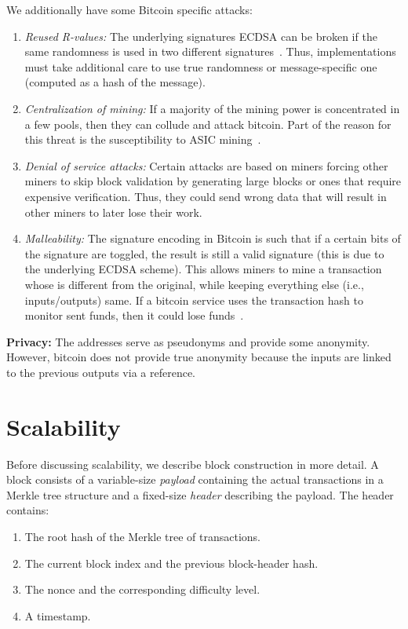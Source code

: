 \documentclass[]{report}   %
\begin{document}
We additionally have some Bitcoin specific attacks:
\begin{enumerate}
	\item {\em Reused R-values:} The underlying signatures ECDSA can be broken if the same randomness is used in two different signatures~\cite{reusedRvalues}. Thus, implementations must take additional care to use true randomness or message-specific one (computed as a hash of the message).
	\item {\em Centralization of mining:} If a majority of the mining power is concentrated in a few pools, then they can collude and attack bitcoin. Part of the reason for this threat is the susceptibility to ASIC mining~\cite{asic}.
	\item {\em Denial of service attacks:} Certain attacks are based on miners forcing other miners to skip block validation by generating large blocks or ones that require expensive verification. Thus, they could send wrong data that will result in other miners to later lose their work.
	\item {\em Malleability:} The signature encoding in Bitcoin is such that if a certain bits of the signature are toggled, the result is still a valid signature (this is due to the underlying ECDSA scheme). This allows miners to mine a transaction whose is different from the original, while keeping everything else (i.e., inputs/outputs) same. If a bitcoin service uses the transaction hash to monitor sent funds, then it could lose funds~\cite{gox}.
\end{enumerate}

\textbf{Privacy:} The addresses serve as pseudonyms and provide some anonymity. However, bitcoin does not provide true anonymity because the inputs are linked to the previous outputs via a reference.


\section{Scalability}

Before discussing scalability, we describe block construction in more detail. A block consists of a variable-size {\em payload} containing the actual transactions in a Merkle tree structure and a fixed-size {\em header} describing the payload. The header contains: 
\begin{enumerate}
	\item The root hash of the Merkle tree of transactions.
	\item The current block index and the previous block-header hash.
	\item The nonce and the corresponding difficulty level.	
	\item A timestamp.
\end{enumerate}
\end{document}
